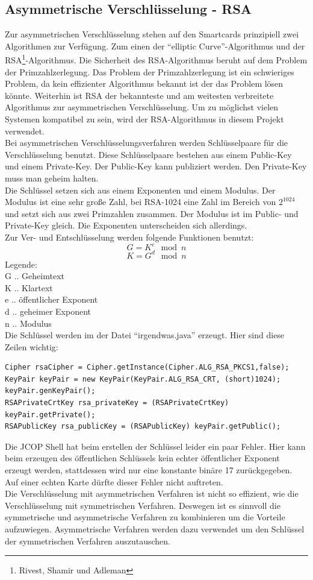 \documentclass[parskip]{scrartcl}
\begin{document}
\subsection{Asymmetrische Verschlüsselung - RSA}
Zur asymmetrischen Verschlüsselung stehen auf den Smartcards prinzipiell zwei Algorithmen zur Verfügung. Zum einen der \enquote{elliptic Curve}-Algorithmus und der RSA\footnote{Rivest, Shamir und Adleman}-Algorithmus. Die Sicherheit des RSA-Algorithmus beruht auf dem Problem der Primzahlzerlegung. Das Problem der Primzahlzerlegung ist ein schwieriges Problem, da kein effizienter Algorithmus bekannt ist der das Problem lösen könnte. Weiterhin ist RSA der bekannteste und am weitesten verbreitete Algorithmus zur asymmetrischen Verschlüsselung. Um zu möglichst vielen Systemen kompatibel zu sein, wird der RSA-Algorithmus in diesem Projekt verwendet.\\
Bei asymmetrischen Verschlüsselungsverfahren werden Schlüsselpaare für die Verschlüsselung benutzt. Diese Schlüsselpaare bestehen aus einem Public-Key und einem Private-Key. Der Public-Key kann publiziert werden. Den Private-Key muss man geheim halten.\\
Die Schlüssel setzen sich aus einem Exponenten und einem Modulus. Der Modulus ist eine sehr große Zahl, bei RSA-1024 eine Zahl im Bereich von $ 2^{1024} $ und setzt sich aus zwei Primzahlen zusammen. Der Modulus ist im Public- und Private-Key gleich. Die Exponenten unterscheiden sich allerdings.\\
Zur Ver- und Entschlüsselung werden folgende Funktionen benutzt:  
 $$ G = K^{e}\mod{n} $$
 $$ K = G^{d}\mod{n} $$
 Legende: \\
 G .. Geheimtext\\
 K .. Klartext\\
 e .. öffentlicher Exponent\\
 d .. geheimer Exponent\\
 n .. Modulus\\
Die Schlüssel werden im der Datei \enquote{irgendwas.java} erzeugt. Hier sind diese Zeilen wichtig:
\label{RSAKeyPair}
\begin{lstlisting}
Cipher rsaCipher = Cipher.getInstance(Cipher.ALG_RSA_PKCS1,false);
KeyPair keyPair = new KeyPair(KeyPair.ALG_RSA_CRT, (short)1024);
keyPair.genKeyPair();
RSAPrivateCrtKey rsa_privateKey = (RSAPrivateCrtKey) keyPair.getPrivate();
RSAPublicKey rsa_publicKey = (RSAPublicKey) keyPair.getPublic();
\end{lstlisting}
Die JCOP Shell hat beim erstellen der Schlüssel leider ein paar Fehler. Hier kann beim erzeugen des öffentlichen Schlüssels kein echter öffentlicher Exponent erzeugt werden, stattdessen wird nur eine konstante binäre 17 zurückgegeben.\\
Auf einer echten Karte dürfte dieser Fehler nicht auftreten.\\
Die Verschlüsselung mit asymmetrischen Verfahren ist nicht so effizient, wie die Verschlüsselung mit symmetrischen Verfahren. Deswegen ist es sinnvoll die symmetrische und asymmetrische Verfahren zu kombinieren um die Vorteile aufzuwiegen. Asymmetrische Verfahren werden dazu verwendet um den Schlüssel der symmetrischen Verfahren auszutauschen.
\end{document}
